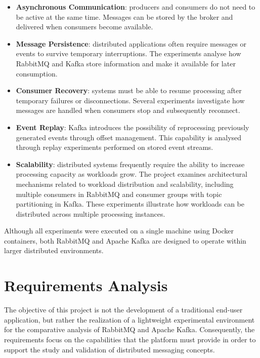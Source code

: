 \documentclass{scrartcl}
\begin{document}
\begin{itemize}
\item \textbf{Asynchronous Communication}: producers and consumers do not need to be active at the same time. Messages can be stored by the broker and delivered when consumers become available. 

\item \textbf{Message Persistence}: distributed applications often require messages or events to survive temporary interruptions. The experiments analyse how RabbitMQ and Kafka store information and make it available for later consumption.

\item \textbf{Consumer Recovery}: systems must be able to resume processing after temporary failures or disconnections. Several experiments investigate how messages are handled when consumers stop and subsequently reconnect.

\item \textbf{Event Replay}: Kafka introduces the possibility of reprocessing previously generated events through offset management. This capability is analysed through replay experiments performed on stored event streams.

\item \textbf{Scalability}: distributed systems frequently require the ability to increase
processing capacity as workloads grow. The project examines architectural mechanisms
related to workload distribution and scalability, including multiple consumers in
RabbitMQ and consumer groups with topic partitioning in Kafka. These experiments
illustrate how workloads can be distributed across multiple processing instances.

\end{itemize}

Although all experiments were executed on a single machine using Docker containers,
both RabbitMQ and Apache Kafka are designed to operate within larger distributed
environments. 

\section{Requirements Analysis}\label{requirements}

The objective of this project is not the development of a traditional end-user application, but rather the realization of a lightweight experimental environment for the comparative analysis of RabbitMQ and Apache Kafka. Consequently, the requirements focus on the capabilities that the platform must provide in order to support the study and validation of distributed messaging concepts.
\end{document}
